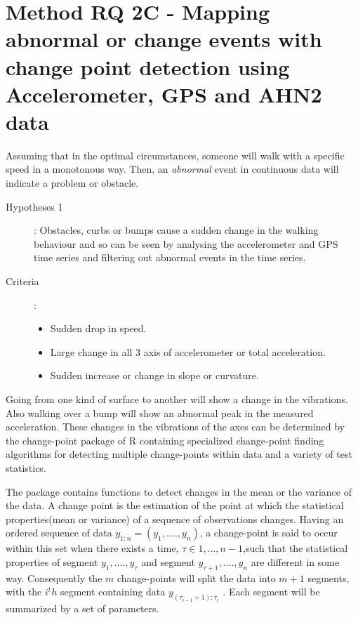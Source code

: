 \section{Method RQ 2C - Mapping abnormal or change events with change point detection using Accelerometer, GPS and AHN2 data}

Assuming that in the optimal circumstances, someone will walk with a specific speed in a monotonous way. Then, an \emph{abnormal} event in continuous data will indicate a problem or obstacle. 

\begin{description}
\item[Hypotheses 1] : Obstacles, curbs or bumps cause a sudden change in the walking behaviour and so can be seen by analysing the accelerometer and GPS time series and filtering out abnormal events in the time series.  
\item[Criteria]: 
\begin{itemize}
\item Sudden drop in speed.
\item Large change in all 3 axis of accelerometer or total acceleration. 
\item Sudden increase or change in slope or curvature. 
\end{itemize}
\end{description}

Going from one kind of surface to another will show a change in the vibrations. Also walking over a bump will show an abnormal peak in the measured acceleration. These changes in the vibrations of the axes can be determined by the change-point package of R containing specialized change-point finding algorithms for detecting multiple change-points within data and a variety of test statistics.~\cite{changepoint2015,  killick2014} 

The package contains functions to detect changes in the mean or the variance of the data. A change point is the estimation of the point at which the statistical properties(mean or variance) of a sequence of observations changes. Having an ordered sequence of data $y_{1:n} = (y_{1}, .... , y_{n})$, a change-point is said to occur within this set when there exists a time, $τ ∈ {1, . . . , n − 1}$,such that the statistical properties of segment ${y_{1}, .... , y_{τ}}$ and segment ${y_{τ+1}, .... , y_{n}}$ are different in some way. Consequently the $m$ change-points will split the data into $m + 1$ segments, with the $i^th$ segment containing data $y_{(τ_{i−1} +1):τ_{i}}$ . Each segment will be summarized by a set of parameters.~\cite{killick2014}

